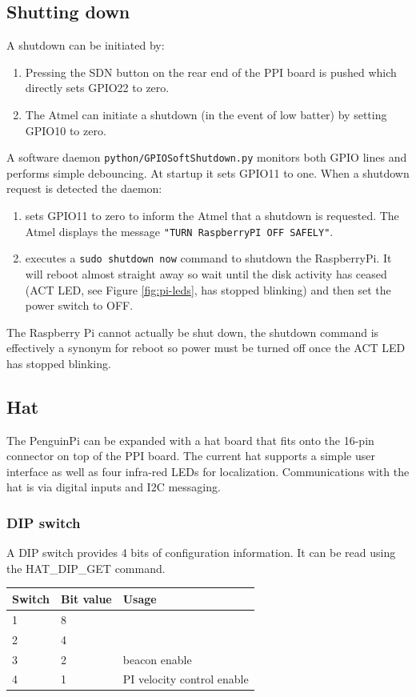 \documentclass[11pt,fleqn]{article}
\begin{document}
\subsection{Shutting down}
A shutdown can be initiated by:
\begin{enumerate}
\item Pressing the SDN button on the rear end of the PPI board is pushed which directly sets GPIO22 to zero.
\item The Atmel can initiate a shutdown (in the event of low batter) by setting GPIO10 to zero.
\end{enumerate}

A software daemon \texttt{python/GPIOSoftShutdown.py} monitors both GPIO lines and performs simple debouncing.  At startup it
sets GPIO11 to one.
When a shutdown request is detected the daemon:
\begin{enumerate}
\item sets GPIO11 to zero to inform the Atmel that a shutdown is requested.  The Atmel displays the message \texttt{"TURN RaspberryPI OFF SAFELY"}.
\item executes a \texttt{sudo shutdown now} command to shutdown the RaspberryPi.  It will reboot almost straight away so wait until
the disk activity has ceased (ACT LED, see Figure \ref{fig:pi-leds}, has stopped blinking) and then set the power switch to OFF.
\end{enumerate}

The Raspberry Pi cannot actually be shut down, the 
shutdown command is effectively a synonym for reboot so power must be turned off once the ACT LED has stopped blinking.


\subsection{Hat}
The PenguinPi can be expanded with a hat board that fits onto the 16-pin connector on top of the PPI board.
The current hat supports a simple user interface as well as four infra-red LEDs for
localization.  Communications with the hat is via digital inputs and I2C messaging.

\subsubsection{DIP switch}
A DIP switch provides 4 bits of configuration information.  
It can be read using the HAT\_DIP\_GET command. 

\begin{center}
\begin{tabular}{|l|l|l|}\hline
Switch & Bit value & Usage \\ \hline\hline
1 & 8 & \\
2 & 4 & \\
3 & 2 & beacon enable \\
4 & 1 & PI velocity control enable \\\hline
\end{tabular}
\end{center}
\end{document}
